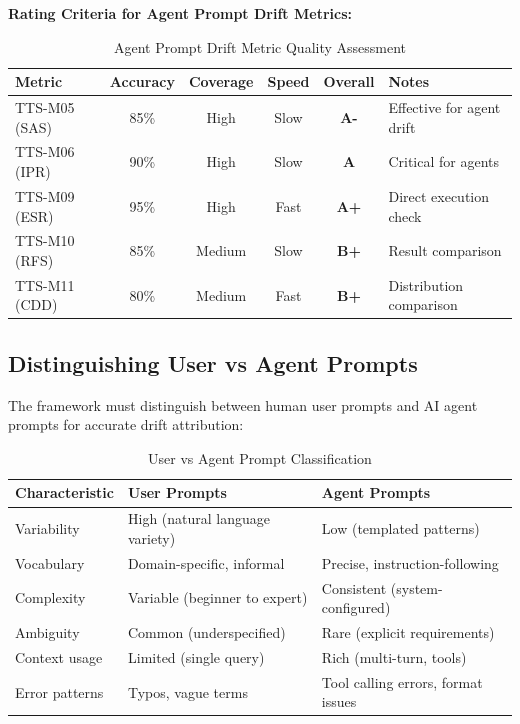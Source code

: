 \textbf{Rating Criteria for Agent Prompt Drift Metrics:}

\begin{table}[htbp]
\centering
\footnotesize
\caption{Agent Prompt Drift Metric Quality Assessment}
\label{tab:agent-metric-rating}
\begin{tabularx}{\textwidth}{@{}l c c c c X@{}}
\toprule
\textbf{Metric} & \textbf{Accuracy} & \textbf{Coverage} & \textbf{Speed} & \textbf{Overall} & \textbf{Notes} \\
\midrule
TTS-M05 (SAS) & 85\% & High & Slow & \textbf{A-} & Effective for agent drift \\
TTS-M06 (IPR) & 90\% & High & Slow & \textbf{A} & Critical for agents \\
TTS-M09 (ESR) & 95\% & High & Fast & \textbf{A+} & Direct execution check \\
TTS-M10 (RFS) & 85\% & Medium & Slow & \textbf{B+} & Result comparison \\
TTS-M11 (CDD) & 80\% & Medium & Fast & \textbf{B+} & Distribution comparison \\
\bottomrule
\end{tabularx}
\end{table}

\subsection{Distinguishing User vs Agent Prompts}

The framework must distinguish between human user prompts and AI agent prompts
for accurate drift attribution:

\begin{table}[htbp]
\centering
\footnotesize
\caption{User vs Agent Prompt Classification}
\label{tab:user-agent-classification}
\begin{tabularx}{\textwidth}{@{}l X X@{}}
\toprule
\textbf{Characteristic} & \textbf{User Prompts} & \textbf{Agent Prompts} \\
\midrule
Variability & High (natural language variety) & Low (templated patterns) \\
Vocabulary & Domain-specific, informal & Precise, instruction-following \\
Complexity & Variable (beginner to expert) & Consistent (system-configured) \\
Ambiguity & Common (underspecified) & Rare (explicit requirements) \\
Context usage & Limited (single query) & Rich (multi-turn, tools) \\
Error patterns & Typos, vague terms & Tool calling errors, format issues \\
\bottomrule
\end{tabularx}
\end{table}


